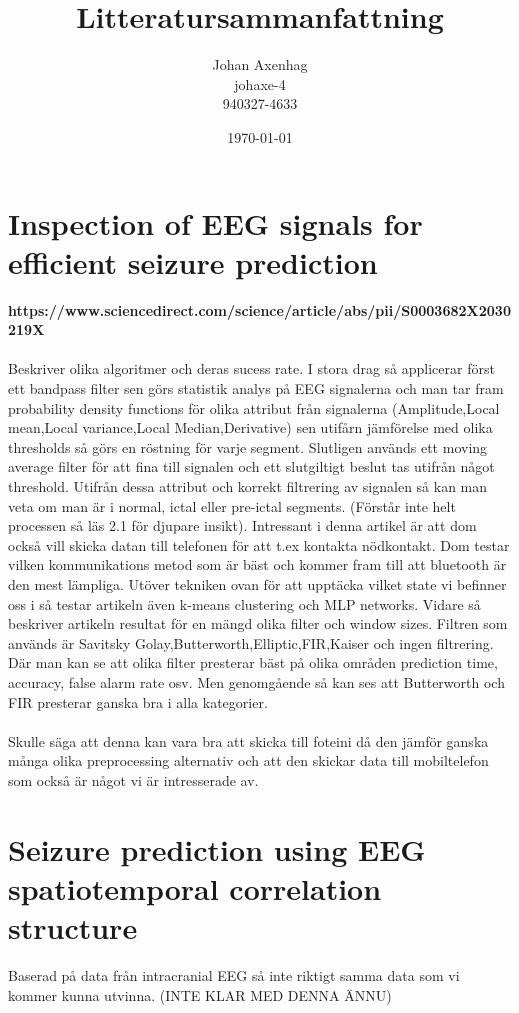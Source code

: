 \documentclass[a4paper,11pt]{LTU_lab_report}
\begin{document}
\author{Johan Axenhag\\
johaxe-4\\
940327-4633}
\date{\today}
\title{Litteratursammanfattning}
\maketitle
\thispagestyle{empty} 

\newpage
\tableofcontents
\newpage

\section{Inspection of EEG signals for efficient seizure prediction}
\textbf{https://www.sciencedirect.com/science/article/abs/pii/S0003682X2030219X}\\\\
Beskriver olika algoritmer och deras sucess rate. I stora drag så applicerar först ett bandpass filter sen görs statistik analys på EEG signalerna och man tar fram probability density functions för olika attribut från signalerna (Amplitude,Local mean,Local variance,Local Median,Derivative) sen utifårn jämförelse med olika thresholds så görs en röstning för varje segment. Slutligen används ett moving average filter för att fina till signalen och ett slutgiltigt beslut tas utifrån något threshold. Utifrån dessa attribut och korrekt filtrering av signalen så kan man veta om man är i normal, ictal eller pre-ictal segments. (Förstår inte helt processen så läs 2.1 för djupare insikt). Intressant i denna artikel är att dom också vill skicka datan till telefonen för att t.ex kontakta nödkontakt. Dom testar vilken kommunikations metod som är bäst och kommer fram till att bluetooth är den mest lämpliga. Utöver tekniken ovan för att upptäcka vilket state vi befinner oss i så testar artikeln även k-means clustering och MLP networks. Vidare så beskriver artikeln resultat för en mängd olika filter och window sizes. Filtren som används är Savitsky Golay,Butterworth,Elliptic,FIR,Kaiser och ingen filtrering. Där man kan se att olika filter presterar bäst på olika områden prediction time, accuracy, false alarm rate osv. Men genomgående så kan ses att Butterworth och FIR presterar ganska bra i alla kategorier.\\\\

Skulle säga att denna kan vara bra att skicka till foteini då den jämför ganska många olika preprocessing alternativ och att den skickar data till mobiltelefon som också är något vi är intresserade av.
\section{Seizure prediction using EEG spatiotemporal correlation structure}
Baserad på data från intracranial EEG så inte riktigt samma data som vi kommer kunna utvinna. (INTE KLAR MED DENNA ÄNNU) 
\end{document}
